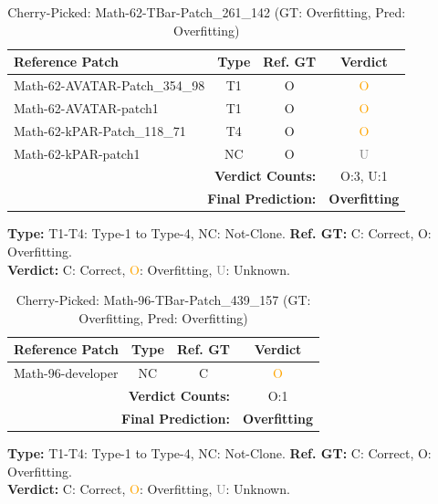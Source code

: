 \begin{table}[t]
\centering
\caption{Cherry-Picked: Math-62-TBar-Patch\_261\_142 (GT: Overfitting, Pred: Overfitting)}
\label{tab:cherry-Math62TBarPatch261142}
\footnotesize
\renewcommand{\arraystretch}{1.1}
\setlength{\tabcolsep}{4pt}
\begin{tabular}{l|c|c|c}
\hline
\textbf{Reference Patch} & \textbf{Type} & \textbf{Ref. GT} & \textbf{Verdict} \\
\hline
Math-62-AVATAR-Patch\_354\_98 & T1 & O & \textcolor{orange}{O} \\
Math-62-AVATAR-patch1 & T1 & O & \textcolor{orange}{O} \\
Math-62-kPAR-Patch\_118\_71 & T4 & O & \textcolor{orange}{O} \\
Math-62-kPAR-patch1 & NC & O & \textcolor{gray}{U} \\
\hline
\multicolumn{3}{r|}{\textbf{Verdict Counts:}} & O:3, U:1 \\
\multicolumn{3}{r|}{\textbf{Final Prediction:}} & \textbf{Overfitting} \\
\hline
\end{tabular}
\vspace{1mm}
\parbox{\linewidth}{\centering\footnotesize 
\vspace{1mm}
\textbf{Type:} T1-T4: Type-1 to Type-4, NC: Not-Clone. \;
\textbf{Ref. GT:} C: Correct, O: Overfitting. \\
\textbf{Verdict:} \textcolor{green!60!black}{C}: Correct, \textcolor{orange}{O}: Overfitting, \textcolor{gray}{U}: Unknown.}
\end{table}


\begin{table}[t]
\centering
\caption{Cherry-Picked: Math-96-TBar-Patch\_439\_157 (GT: Overfitting, Pred: Overfitting)}
\label{tab:cherry-Math96TBarPatch439157}
\footnotesize
\renewcommand{\arraystretch}{1.1}
\setlength{\tabcolsep}{4pt}
\begin{tabular}{l|c|c|c}
\hline
\textbf{Reference Patch} & \textbf{Type} & \textbf{Ref. GT} & \textbf{Verdict} \\
\hline
Math-96-developer & NC & C & \textcolor{orange}{O} \\
\hline
\multicolumn{3}{r|}{\textbf{Verdict Counts:}} & O:1 \\
\multicolumn{3}{r|}{\textbf{Final Prediction:}} & \textbf{Overfitting} \\
\hline
\end{tabular}
\vspace{1mm}
\parbox{\linewidth}{\centering\footnotesize 
\vspace{1mm}
\textbf{Type:} T1-T4: Type-1 to Type-4, NC: Not-Clone. \;
\textbf{Ref. GT:} C: Correct, O: Overfitting. \\
\textbf{Verdict:} \textcolor{green!60!black}{C}: Correct, \textcolor{orange}{O}: Overfitting, \textcolor{gray}{U}: Unknown.}
\end{table}


